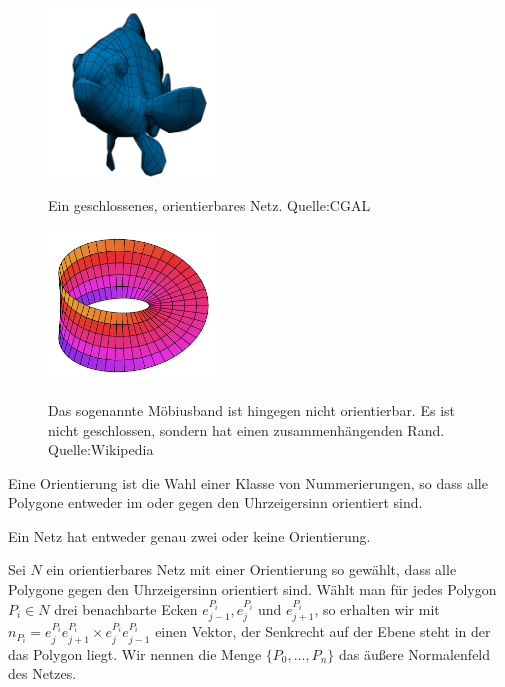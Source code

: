 \begin{figure}[H]
    \centering
    \includegraphics[width=0.4\textwidth]{images/clown_fish.jpg}
    \label{fig:closed-orientable-mesh}
    \caption{Ein geschlossenes, orientierbares Netz. Quelle:CGAL}
\end{figure}

\begin{figure}[H]
\centering
    \includegraphics[width=0.4\textwidth]{images/Moebius_strip.png}
    \label{fig:moebius-strip}
    \caption[Möbiusband. Quelle:Wikipedia]{Das sogenannte Möbiusband ist hingegen nicht orientierbar. Es ist nicht geschlossen, sondern hat einen zusammenhängenden Rand. Quelle:Wikipedia}
\end{figure}

\begin{Definition}
Eine Orientierung ist die Wahl einer Klasse von Nummerierungen, so dass alle Polygone entweder im oder gegen den Uhrzeigersinn orientiert sind.
\end{Definition}

\begin{Bemerkung}
Ein Netz hat entweder genau zwei oder keine Orientierung.  
\end{Bemerkung}


\begin{Definition}
Sei $N$ ein orientierbares Netz mit einer Orientierung so gewählt, dass  alle Polygone gegen den Uhrzeigersinn orientiert sind. Wählt man für jedes Polygon $P_i \in N$ drei benachbarte Ecken $e_{j-1}^{P_i}, e_{j}^{P_i}$ und $e_{j+1}^{P_i}$, so erhalten wir
mit $n_{P_i} = e_{j}^{P_i}e_{j+1}^{P_i} \times e_{j}^{P_i}e_{j-1}^{P_i}$ einen Vektor, der Senkrecht auf der Ebene steht in der das Polygon liegt. Wir nennen die Menge $\{P_0, \hdots, P_n\}$ das äußere Normalenfeld des Netzes. 
\end{Definition}


